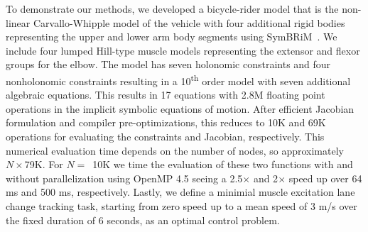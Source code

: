 \documentclass[11pt,twocolumn]{article}
\begin{document}
To demonstrate our methods, we developed a bicycle-rider model that is the
non-linear Carvallo-Whipple model of the vehicle with four additional rigid
bodies representing the upper and lower arm body segments using
SymBRiM~\cite{Stienstra2023a}. We include four lumped Hill-type muscle models
representing the extensor and flexor groups for the elbow. The model has seven
holonomic constraints and four nonholonomic constraints resulting in a
10\textsuperscript{th} order model with seven additional algebraic equations.
This results in 17 equations with 2.8M floating point operations in the implicit
symbolic equations of motion. After efficient Jacobian formulation and compiler
pre-optimizations, this reduces to 10K and 69K operations for evaluating the
constraints and Jacobian, respectively. This numerical evaluation time depends
on the number of nodes, so approximately \(N\times\)79K. For \(N=\)~10K we time
the evaluation of these two functions with and without parallelization using
OpenMP 4.5 seeing a 2.5\(\times\) and 2\(\times\) speed up over 64 ms and 500
ms, respectively. Lastly, we define a minimial muscle excitation lane change
tracking task, starting from zero speed up to a mean speed of 3 m/s over the
fixed duration of 6 seconds, as an optimal control problem.


\vspace{-1.5em}
\end{document}
